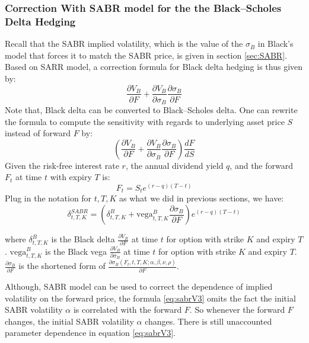 \documentclass[letterpaper,12pt,titlepage,oneside,final]{book}
\numberwithin{equation}{section}
\theoremstyle{definition}
\begin{document}
\subsubsection{Correction With SABR model for the the Black–Scholes Delta Hedging}
Recall that the SABR implied volatility, which is the value of the $\sigma_B$ in Black's model that forces it to match the SABR price, is given in section \ref{sec:SABR}.
Based on SARR model, a correction formula for Black delta hedging is thus given by:
\begin{equation}
\frac{\partial V_{B}}{\partial F} + \frac{\partial V_{B}}{\partial \sigma_B}
\frac{\partial \sigma_B}{\partial F}
\label{eq:sabr}
\end{equation}
Note that, Black delta can be converted to Black–Scholes delta.
One can rewrite the formula to compute the sensitivity with regards to underlying asset price $S$ instead of forward $F$ by:
\begin{equation}
\left(\frac{\partial V_{B}}{\partial F} + \frac{\partial V_{B}}{\partial \sigma_B}
    \frac{\partial \sigma_B}{\partial F}\right)\frac{d F}{d S}
    \label{eq:sabrV2}
    \end{equation}
 Given the risk-free interest rate $r$, the annual dividend yield $q$, and the forward $F_t$ at time $t$ with expiry $T$ is: 
\[
        F_t=S_t e^{(r-q) (T-t)}
 \]
Plug in the notation for $t,T,K$ as what we did in previous sections, we  have:
\begin{equation}
    \delta^{SABR}_{t,T,K}=\left( \delta^{B}_{t,T,K}+\text{vega}^{B}_{t,T,K} \frac{\partial \sigma_B}{\partial F} \right)e^{(r-q) (T-t)}
    \label{eq:sabrV3}
\end{equation}

where 
$\delta^{B}_{t,T,K}$ is the Black delta $\frac{\partial V_{B}}{\partial F}$ at time $t$ for option with strike $K$ and expiry $T$. 
$\text{vega}^{B}_{t,T,K}$ is the Black vega $\frac{\partial V_{B}}{\partial \sigma_{B}}$ at time $t$ for option with strike $K$ and expiry $T$. 
$\frac{\partial \sigma_B}{\partial F}$ is the shortened form  of $\frac{\partial\sigma_{B}(F_t,t,T,K;\alpha,\beta,\nu,\rho)}{\partial F}$.


Although, SABR model can be used to correct the dependence of implied volatility on the forward price, the formula \eqref{eq:sabrV3} omits the fact the initial SABR volatility $\alpha$ is correlated with the forward $F$. So whenever the forward $F$ changes,  the initial SABR volatility $\alpha$ changes.  There is still unaccounted parameter dependence  in  equation \eqref{eq:sabrV3}.
\end{document}
